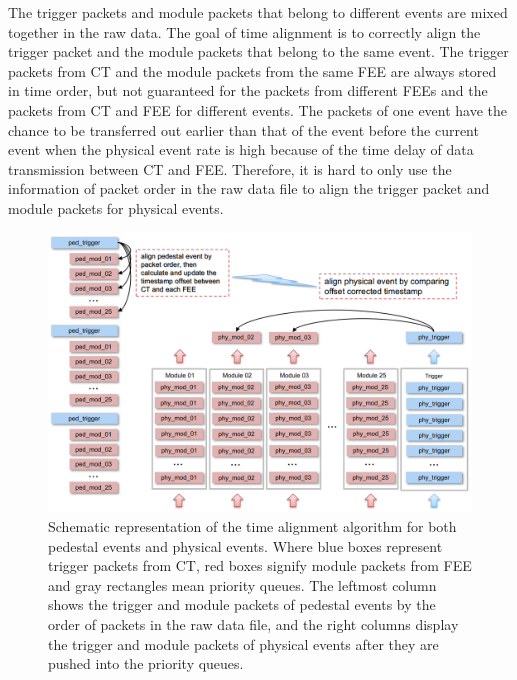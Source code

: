 \documentclass{raa}
\begin{document}
The trigger packets and module packets that belong to different events are mixed together in the raw data. The goal of time alignment is to correctly align the trigger packet and the module packets that belong to the same event. The trigger packets from CT and the module packets from the same FEE are always stored in time order, but not guaranteed for the packets from different FEEs and the packets from CT and FEE for different events. The packets of one event have the chance to be transferred out earlier than that of the event before the current event when the physical event rate is high because of the time delay of data transmission between CT and FEE. Therefore, it is hard to only use the information of packet order in the raw data file to align the trigger packet and module packets for physical events.

\begin{figure}[!ht]
\centering
\includegraphics[width=13cm]{images/time_alignment_method.png}
\caption{Schematic representation of the time alignment algorithm for both pedestal events and physical events. Where blue boxes represent trigger packets from CT, red boxes signify module packets from FEE and gray rectangles mean priority queues. The leftmost column shows the trigger and module packets of pedestal events by the order of packets in the raw data file, and the right columns display the trigger and module packets of physical events after they are pushed into the priority queues.}
\label{fig:time_align}
\end{figure}
\end{document}
